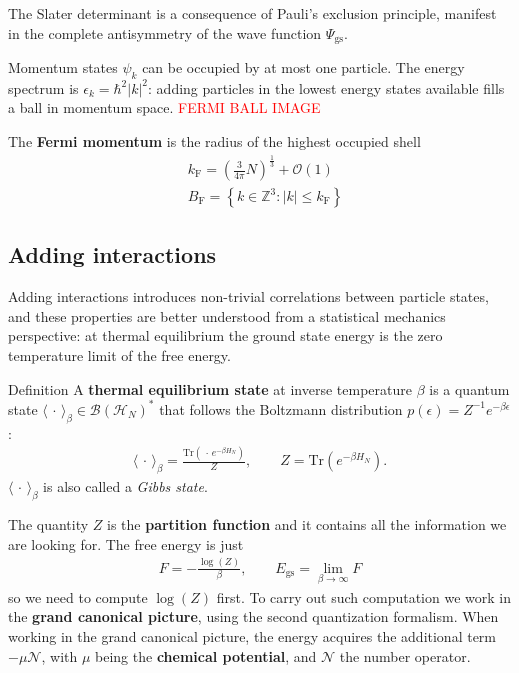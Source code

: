 \documentclass{beamer}
\begin{document}
\begin{frame}
	The Slater determinant is a consequence of Pauli's exclusion principle, manifest in the
	complete antisymmetry of the wave function $\Psi_{\mathrm{gs}}$.

	Momentum states $\psi_k$ can be occupied by at most one particle. The energy
	spectrum is $\epsilon_k = \hbar^2 \vert k\vert^2$: adding particles in the lowest energy
	states available fills a ball in momentum space. \textcolor{red}{FERMI BALL IMAGE}

	The \textbf{Fermi momentum} is the radius of the highest occupied shell
	\begin{align*}
		&k_{\mathrm{F}} = \left(\frac{3}{4\pi}N\right)^{\frac{1}{3}} + \mathcal{O}(1)\\
		&B_{\mathrm{F}} = \left\{ k\in\mathbb{Z}^3 : \vert k\vert\leq k_{\mathrm{F}} \right\}
	\end{align*}
\end{frame}

\subsection{Adding interactions}

\begin{frame}
	Adding interactions introduces non-trivial correlations between particle states, and these
	properties are better understood from a statistical mechanics perspective: at
	thermal equilibrium the ground state energy is the zero temperature limit of the free
	energy.

	\begin{block}{Definition}
		A \textbf{thermal equilibrium state} at inverse temperature $\beta$ is a quantum state
		$\langle\,\cdot\,\rangle_\beta\in\mathcal{B}(\mathcal{H}_N)^*$ that follows the
		Boltzmann distribution $p(\epsilon)=Z^{-1}e^{-\beta\epsilon}$:
		\begin{align*}
			\langle\,\cdot\,\rangle_\beta = \frac{\mathrm{Tr}(\,\cdot\,e^{-\beta H_N})}{Z},
			\qquad Z = \mathrm{Tr}(e^{-\beta H_N}).
		\end{align*}
		$\langle\,\cdot\,\rangle_\beta$ is also called a
		\textit{Gibbs state}.
	\end{block}
\end{frame}

\begin{frame}
	The quantity $Z$ is the \textbf{partition function} and it contains all the information we
	are looking for. The free energy is just
	\begin{align*}
		F = -\frac{\log(Z)}{\beta},\qquad
		E_{\mathrm{gs}} = \lim_{\beta\to\infty} F
	\end{align*}
	so we need to compute $\log(Z)$ first. To carry out such computation we work in the
	\textbf{grand canonical picture}, using the second quantization formalism. When working
	in the grand canonical picture, the energy acquires the additional term $-\mu\mathcal{N}$,
	with $\mu$ being the \textbf{chemical potential}, and $\mathcal{N}$ the number operator.
\end{frame}
\end{document}
